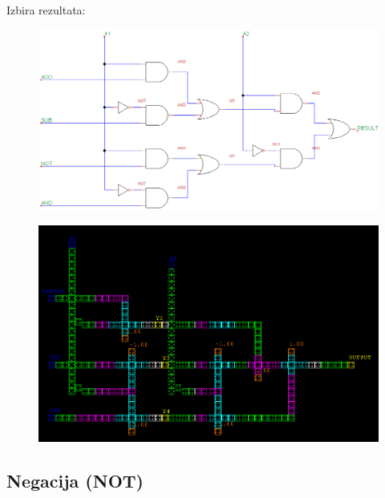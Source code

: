 \documentclass[seminar, slovene]{FRIreport}
\begin{document}
\begin{minipage}[H]{16cm}
Izbira rezultata:\\
\begin{center}
\begin{figure}[H]
\begin{center}
\includegraphics[width=12cm]{vezja/img/mux}
\end{center}
\end{figure}
\begin{figure}[H]
\begin{center}
\includegraphics[width=13cm]{qca/img/mux}
\end{center}
\end{figure}
\end{center}
\end{minipage}

\subsection{Negacija (NOT)}
\end{document}
